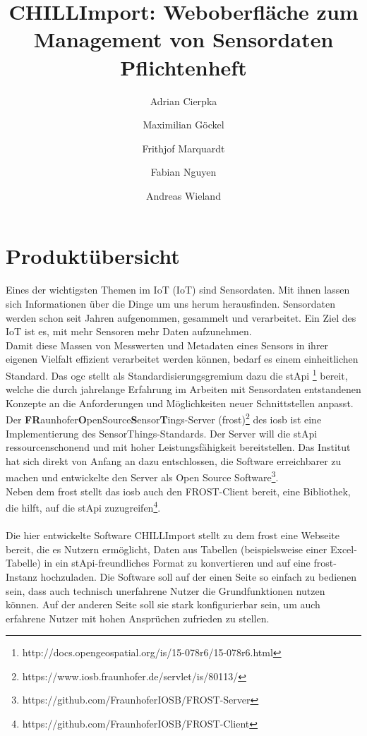 \documentclass[a4paper, 12 pt]{article}
\author{Adrian Cierpka \and  Maximilian Göckel  \and Frithjof Marquardt \and Fabian Nguyen \and Andreas Wieland}
\title{CHILLImport: Weboberfläche zum Management von Sensordaten\\Pflichtenheft}
\begin{document}
\maketitle
\newpage
\tableofcontents
\newpage

	\section{Produktübersicht}

	Eines der wichtigsten Themen im \gls{IoT} (IoT) sind Sensordaten. Mit ihnen lassen sich Informationen über die Dinge um uns herum herausfinden. Sensordaten werden schon seit Jahren aufgenommen, gesammelt und verarbeitet. Ein Ziel des IoT ist es, mit mehr Sensoren mehr Daten aufzunehmen. \\

	Damit diese Massen von Messwerten und Metadaten eines Sensors in ihrer eigenen Vielfalt effizient verarbeitet werden können, bedarf es einem einheitlichen Standard. Das \gls{ogc} stellt als Standardisierungsgremium dazu die \gls{stApi} \footnote{http://docs.opengeospatial.org/is/15-078r6/15-078r6.html} bereit, welche die durch jahrelange Erfahrung im Arbeiten mit Sensordaten entstandenen Konzepte an die Anforderungen und Möglichkeiten neuer Schnittstellen anpasst. \\

	Der \textbf{FR}aunhofer\textbf{O}penSource\textbf{S}ensor\textbf{T}ings-Server (\gls{frost})\footnote{https://www.iosb.fraunhofer.de/servlet/is/80113/} des \gls{iosb} ist eine Implementierung des SensorThings-Standards. Der Server will die \gls{stApi} ressourcenschonend und mit hoher Leistungsfähigkeit bereitstellen. Das Institut hat sich direkt von Anfang an dazu entschlossen, die Software erreichbarer zu machen und entwickelte den Server als Open Source Software\footnote{https://github.com/FraunhoferIOSB/FROST-Server}. \\

	Neben dem \gls{frost} stellt das \gls{iosb} auch den FROST-Client bereit, eine Bibliothek, die hilft, auf die \gls{stApi} zuzugreifen\footnote{https://github.com/FraunhoferIOSB/FROST-Client}. \\
	\ \\
	Die hier entwickelte Software CHILLImport stellt zu dem \gls{frost} eine Webseite bereit, die es Nutzern ermöglicht, Daten aus Tabellen (beispielsweise einer Excel-Tabelle) in ein \gls{stApi}-freundliches Format zu konvertieren und auf eine \gls{frost}-Instanz hochzuladen. Die Software soll auf der einen Seite so einfach zu bedienen sein, dass auch technisch unerfahrene Nutzer die Grundfunktionen nutzen können. Auf der anderen Seite soll sie stark konfigurierbar sein, um auch erfahrene Nutzer mit hohen Ansprüchen zufrieden zu stellen.\\
\end{document}
